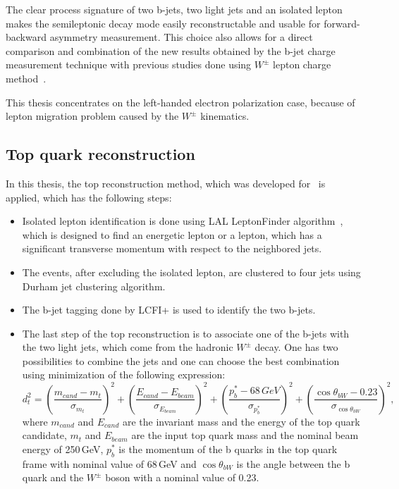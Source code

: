 The clear process signature of two b-jets, two light jets and an isolated lepton makes the semileptonic decay mode easily reconstructable and usable for forward-backward asymmetry measurement. 
This choice also allows for a direct comparison and combination of the new results obtained by the b-jet charge measurement technique with previous studies done using $W^\pm$ lepton charge method~\cite{bib:ILCTOP}.

This thesis concentrates on the left-handed electron polarization case, because of lepton migration problem caused by the $W^\pm$ kinematics.


\subsection{Top quark reconstruction}
In this thesis, the top reconstruction method, which was developed for~\cite{bib:ILCTOP} is applied, which has the following steps:
\begin{itemize}
	\item Isolated lepton identification is done using LAL LeptonFinder algorithm~\cite{bib:Doublet}, which is designed to find an energetic lepton or a lepton, which has a significant transverse momentum with respect to the neighbored jets. 
	\item The events, after excluding the isolated lepton, are clustered to four jets using Durham jet clustering algorithm.
	\item The b-jet tagging done by LCFI+ is used to identify the two b-jets. 
	\item The last step of the top reconstruction is to associate one of the b-jets with the two light jets, which come from the hadronic $W^\pm$ decay.  One has two possibilities to combine the jets and one can choose the best combination using minimization of the following expression:
	\begin{equation}
	\label{formula:Chi2Top_3}
	d^2_{t} = (\frac{m_{cand}-m_{t}}{\sigma_{m_t}})^2 + (\frac{E_{cand}-E_{beam}}{\sigma_{E_{beam}}})^2+(\frac{p^*_b-68\,GeV}{\sigma_{p^*_b}})^2 + (\frac{\cos\theta_{bW}-0.23}{\sigma_{\cos\theta_{bW}}})^2,
	\end{equation}
	where $m_{cand}$ and $E_{cand}$ are the invariant mass and the energy of the top quark candidate, $m_t$ and $E_{beam}$ are the input top quark mass and the nominal beam energy of 250\,GeV, $p^*_b$ is the momentum of the b quarks in the top quark frame with nominal value of 68\,GeV and $\cos\theta_{bW}$ is the angle between the b quark and the $W^\pm$ boson with a nominal value of 0.23.
\end{itemize}

